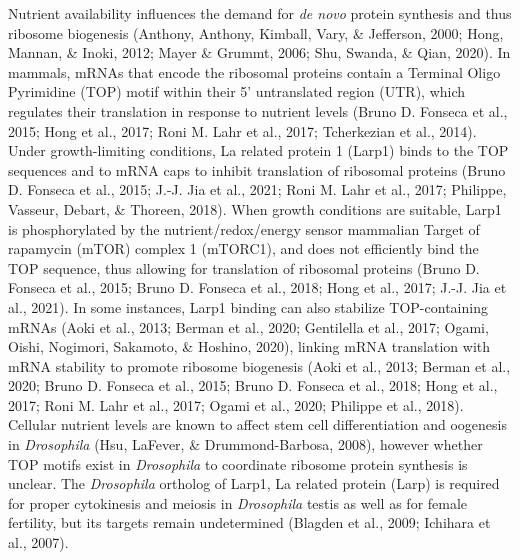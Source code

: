 \documentclass[12pt,oneside]{reedthesis}
\begin{document}
Nutrient availability influences the demand for \emph{de novo} protein
synthesis and thus ribosome biogenesis
(Anthony, Anthony, Kimball, Vary, \& Jefferson, 2000; Hong, Mannan, \& Inoki, 2012; Mayer \& Grummt, 2006; Shu, Swanda, \& Qian, 2020). In mammals, mRNAs that encode the
ribosomal proteins contain a Terminal Oligo Pyrimidine (TOP) motif
within their 5' untranslated region (UTR), which regulates their
translation in response to nutrient levels (Bruno D. Fonseca et al., 2015; Hong et al., 2017; Roni M. Lahr et al., 2017; Tcherkezian et al., 2014). Under growth-limiting
conditions, La related protein 1 (Larp1) binds to the TOP sequences and
to mRNA caps to inhibit translation of ribosomal proteins
(Bruno D. Fonseca et al., 2015; J.-J. Jia et al., 2021; Roni M. Lahr et al., 2017; Philippe, Vasseur, Debart, \& Thoreen, 2018). When growth conditions are
suitable, Larp1 is phosphorylated by the nutrient/redox/energy sensor
mammalian Target of rapamycin (mTOR) complex 1 (mTORC1), and does not
efficiently bind the TOP sequence, thus allowing for translation of
ribosomal proteins (Bruno D. Fonseca et al., 2015; Bruno D. Fonseca et al., 2018; Hong et al., 2017; J.-J. Jia et al., 2021). In some instances, Larp1 binding can also
stabilize TOP-containing mRNAs (Aoki et al., 2013; Berman et al., 2020; Gentilella et al., 2017; Ogami, Oishi, Nogimori, Sakamoto, \& Hoshino, 2020), linking mRNA translation
with mRNA stability to promote ribosome biogenesis
(Aoki et al., 2013; Berman et al., 2020; Bruno D. Fonseca et al., 2015; Bruno D. Fonseca et al., 2018; Hong et al., 2017; Roni M. Lahr et al., 2017; Ogami et al., 2020; Philippe et al., 2018). Cellular nutrient levels are
known to affect stem cell differentiation and oogenesis in \emph{Drosophila}
(Hsu, LaFever, \& Drummond-Barbosa, 2008), however whether TOP motifs exist in
\emph{Drosophila} to coordinate ribosome protein synthesis is unclear. The
\emph{Drosophila} ortholog of Larp1, La related protein (Larp) is required
for proper cytokinesis and meiosis in \emph{Drosophila} testis as well as for
female fertility, but its targets remain undetermined (Blagden et al., 2009; Ichihara et al., 2007).
\end{document}
